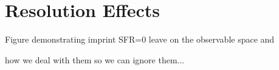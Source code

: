 \section{Resolution Effects} \label{sec:res}

Figure demonstrating imprint SFR=0 leave on the observable space and 

how we deal with them so we can ignore them...
